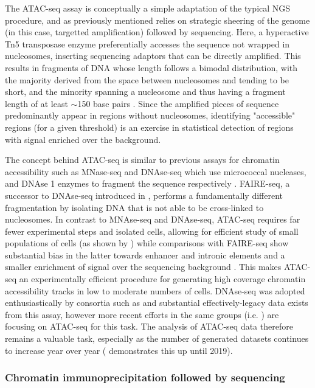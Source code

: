 The ATAC-seq assay is conceptually a simple adaptation of the typical NGS procedure, and as previously mentioned relies on strategic sheering of the genome (in this case, targetted amplification) followed by sequencing. Here, a hyperactive Tn5 transposase enzyme preferentially accesses the sequence not wrapped in nucleosomes, inserting sequencing adaptors that can be directly amplified. This results in fragments of DNA whose length follows a bimodal distribution, with the majority derived from the space between nucleosomes and tending to be short, and the minority spanning a nucleosome and thus having a fragment length of at least $\sim$150 base pairs \cite{Yan2020a}. Since the amplified pieces of sequence predominantly appear in regions without nucleosomes, identifying "accessible" regions (for a given threshold) is an exercise in statistical detection of regions with signal enriched over the background.

The concept behind ATAC-seq is similar to previous assays for chromatin accessibility such as MNase-seq and DNAse-seq which use micrococcal nucleases, and DNAse 1 enzymes to fragment the sequence respectively \cite{Bell2011a}. FAIRE-seq, a successor to DNAse-seq introduced in \textcite{Giresi2007}, performs a fundamentally different fragmentation by isolating DNA that is not able to be cross-linked to nucleosomes. In contrast to MNAse-seq and DNAse-seq, ATAC-seq requires far fewer experimental steps and isolated cells, allowing for efficient study of small populations of cells (as shown by \textcite{Buenrostro2015a}) while comparisons with FAIRE-seq show substantial bias in the latter towards enhancer and intronic elements and a smaller enrichment of signal over the sequencing background \cite{Tsompana2014}. This makes ATAC-seq an experimentally efficient procedure for generating high coverage chromatin accessibility tracks in low to moderate numbers of cells. DNAse-seq was adopted enthusiastically by consortia such as \textcite{ENCODEProjectConsortium2012} and substantial effectively-legacy data exists from this assay, however more recent efforts in the same groups (i.e. \textcite{Moore2020}) are focusing on ATAC-seq for this task. The analysis of ATAC-seq data therefore remains a valuable task, especially as the number of generated datasets continues to increase year over year (\textcite{Yan2020a} demonstrates this up until 2019).

\subsubsection{Chromatin immunoprecipitation followed by sequencing} \label{intro:chip}

